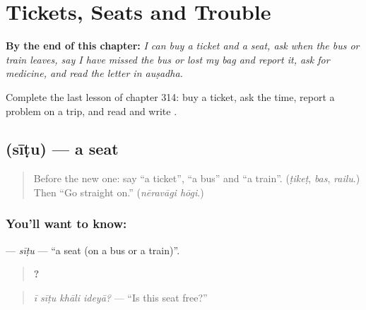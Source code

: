 
\chapter{Tickets, Seats and Trouble}
\label{ch:ka-tickets-seats-and-trouble}

\begin{chapteropening}
\textbf{By the end of this chapter:} \emph{I can buy a ticket and a seat, ask when the bus or train leaves, say I have missed the bus or lost my bag and report it, ask for medicine, and read the letter  in auṣadha.}

Complete the last lesson of chapter 314: buy a ticket, ask the time, report a problem on a trip, and read and write .
\end{chapteropening}

\section[\texorpdfstring{\kn{ಸೀಟು} (sīṭu)}{ಸೀಟು (sīṭu)}]{ (sīṭu) — a seat}

\label{lesson:KA-C314-situ}



\begin{quote}
Before the new one: say \textquotedblleft{}a ticket\textquotedblright{}, \textquotedblleft{}a bus\textquotedblright{} and \textquotedblleft{}a train\textquotedblright{}. (\emph{ṭikeṭ}, \emph{bas}, \emph{railu}.) Then \textquotedblleft{}Go straight on.\textquotedblright{} (\emph{nēravāgi hōgi}.)
\end{quote}

\subsection*{You'll want to know: }
\textbf{} — \emph{sīṭu} — \textquotedblleft{}a seat (on a bus or a train)\textquotedblright{}.

\begin{quote}
\textbf{   ?}
\end{quote}

\begin{quote}
\emph{ī sīṭu khāli ideyā?} — \textquotedblleft{}Is this seat free?\textquotedblright{}
\end{quote}

